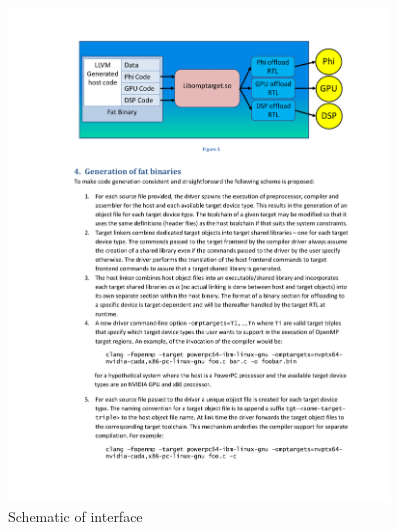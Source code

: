 \begin{figure}
  \centering
  \includegraphics[width=0.9\textwidth]{ImageLibomptarget.pdf}
  \caption{Schematic of \libomptarget{} interface}
  \label{fg:libomptarget_schematic}
\end{figure}
